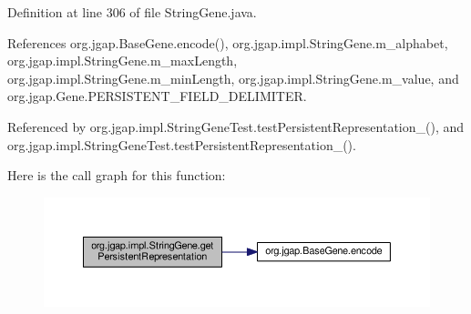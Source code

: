 Definition at line 306 of file String\-Gene.\-java.



References org.\-jgap.\-Base\-Gene.\-encode(), org.\-jgap.\-impl.\-String\-Gene.\-m\-\_\-alphabet, org.\-jgap.\-impl.\-String\-Gene.\-m\-\_\-max\-Length, org.\-jgap.\-impl.\-String\-Gene.\-m\-\_\-min\-Length, org.\-jgap.\-impl.\-String\-Gene.\-m\-\_\-value, and org.\-jgap.\-Gene.\-P\-E\-R\-S\-I\-S\-T\-E\-N\-T\-\_\-\-F\-I\-E\-L\-D\-\_\-\-D\-E\-L\-I\-M\-I\-T\-E\-R.



Referenced by org.\-jgap.\-impl.\-String\-Gene\-Test.\-test\-Persistent\-Representation\-\_(), and org.\-jgap.\-impl.\-String\-Gene\-Test.\-test\-Persistent\-Representation\-\_().



Here is the call graph for this function\-:
\nopagebreak
\begin{figure}[H]
\begin{center}
\leavevmode
\includegraphics[width=350pt]{classorg_1_1jgap_1_1impl_1_1_string_gene_a79af8bfa3fb168ff61d4945b9ed4a319_cgraph}
\end{center}
\end{figure}


